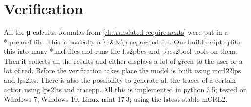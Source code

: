 \documentclass[final]{report}
\begin{document}
\chapter{Verification}
\label{ch:verification}
All the μ-calculus formulas from \cref{ch:translated-requirements} were put in a *.pre.mcf file.
This is basically a \textbackslash n\&\&\textbackslash n separated file.
Our build script splits this into many *.mcf files and runs the lts2pbes and pbes2bool tools on them.
Then it collects all the results and either displays a lot of green to the user or a lot of red.
Before the verification takes place the model is built using mcrl22lps and lps2lts.
There is also the possibility to generate all the traces of a certain action using lps2lts and tracepp.
All this is implemented in python 3.5; tested on Windows 7, Windows 10, Linux mint 17.3; using the latest stable mCRL2.
\end{document}
